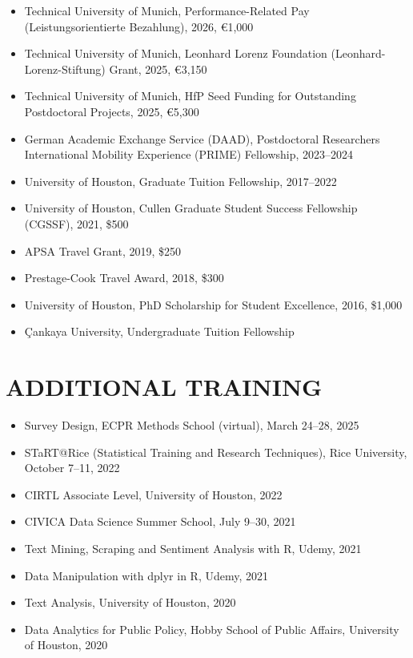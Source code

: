 \documentclass[11pt,a4paper,roman]{moderncv}
\begin{document}
\begin{itemize}
  \item Technical University of Munich, Performance-Related Pay (Leistungsorientierte Bezahlung), 2026, \euro 1,000
  \item Technical University of Munich, Leonhard Lorenz Foundation (Leonhard-Lorenz-Stiftung) Grant, 2025, \euro 3,150
  \item Technical University of Munich, HfP Seed Funding for Outstanding Postdoctoral Projects, 2025, \euro 5,300
  \item German Academic Exchange Service (DAAD), Postdoctoral Researchers International Mobility Experience (PRIME) Fellowship, 2023--2024
  \item University of Houston, Graduate Tuition Fellowship, 2017--2022
  \item University of Houston, Cullen Graduate Student Success Fellowship (CGSSF), 2021, \$500
  \item APSA Travel Grant, 2019, \$250
  \item Prestage-Cook Travel Award, 2018, \$300
  \item University of Houston, PhD Scholarship for Student Excellence, 2016, \$1,000
  \item \c{C}ankaya University, Undergraduate Tuition Fellowship
\end{itemize}

\section{ADDITIONAL TRAINING}

\begin{itemize}
  \item Survey Design, ECPR Methods School (virtual), March 24--28, 2025
  \item STaRT@Rice (Statistical Training and Research Techniques), Rice University, October 7--11, 2022
  \item CIRTL Associate Level, University of Houston, 2022
  \item CIVICA Data Science Summer School, July 9--30, 2021
  \item Text Mining, Scraping and Sentiment Analysis with R, Udemy, 2021
  \item Data Manipulation with dplyr in R, Udemy, 2021
  \item Text Analysis, University of Houston, 2020
  \item Data Analytics for Public Policy, Hobby School of Public Affairs, University of Houston, 2020
\end{itemize}
\end{document}
